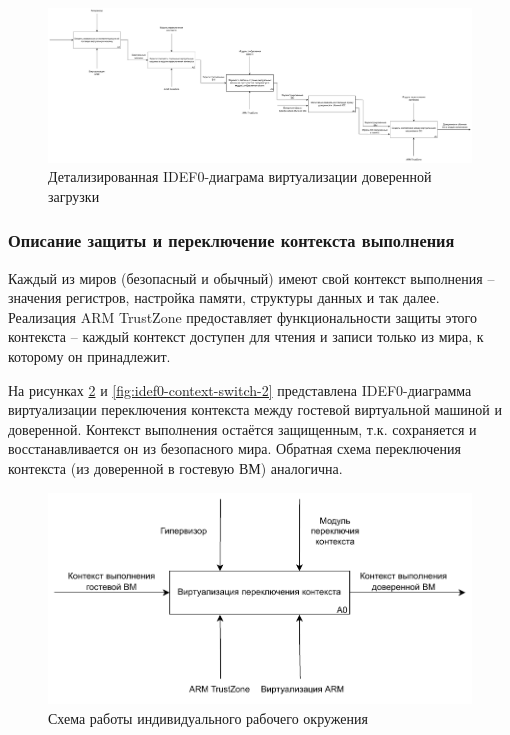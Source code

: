 \begin{figure}[h]
	\centering
	\includegraphics[width=\textwidth]{img/idef0-secure-boot-2.pdf}
	\caption{Детализированная IDEF0-диаграма виртуализации доверенной загрузки}
	\label{fig:idef0-secure-boot-2}
\end{figure}

\subsubsection{Описание защиты и переключение контекста выполнения}

Каждый из миров (безопасный и обычный) имеют свой контекст выполнения -- значения регистров, настройка памяти, структуры данных и так далее. Реализация ARM TrustZone предоставляет функциональности защиты этого контекста -- каждый контекст доступен для чтения и записи только из мира, к которому он принадлежит.

На рисунках \ref{fig:idef0-context-switch-1} и \ref{fig:idef0-context-switch-2} представлена IDEF0-диаграмма виртуализации переключения контекста между гостевой виртуальной машиной и доверенной. Контекст выполнения остаётся защищенным, т.к. сохраняется и восстанавливается он из безопасного мира. Обратная схема переключения контекста (из доверенной в гостевую ВМ) аналогична.

\begin{figure}[h]
	\centering
	\includegraphics[width=\textwidth]{img/idef0-context-switch-1.pdf}
	\caption{Схема работы индивидуального рабочего окружения}
	\label{fig:idef0-context-switch-1}
\end{figure}

